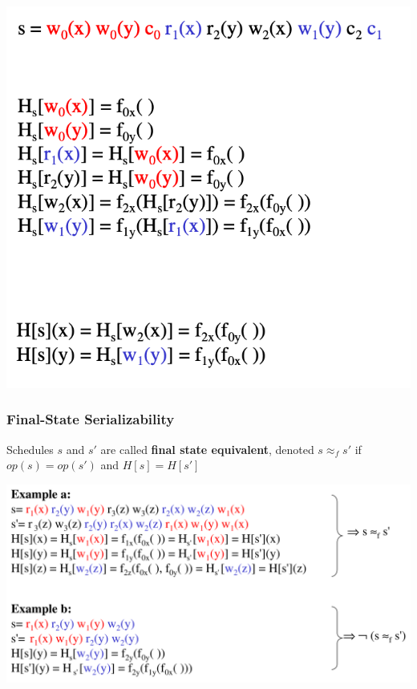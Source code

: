 \documentclass[11pt]{article}
\begin{document}
\begin{center}
\includegraphics[width=.6\textwidth]{../images/bigdatabase/7.png}
\label{}
\end{center}
\subsubsection{Final-State Serializability}
\label{sec:org6d27359}
\begin{definition}[]
Schedules \(s\) and \(s'\) are called \textbf{final state equivalent}, denoted \(s\approx_fs'\)
if \(op(s)=op(s')\) and \(H[s]=H[s']\)
\end{definition}

\begin{center}
\includegraphics[width=.7\textwidth]{../images/bigdatabase/13.png}
\label{}
\end{center}
\end{document}
